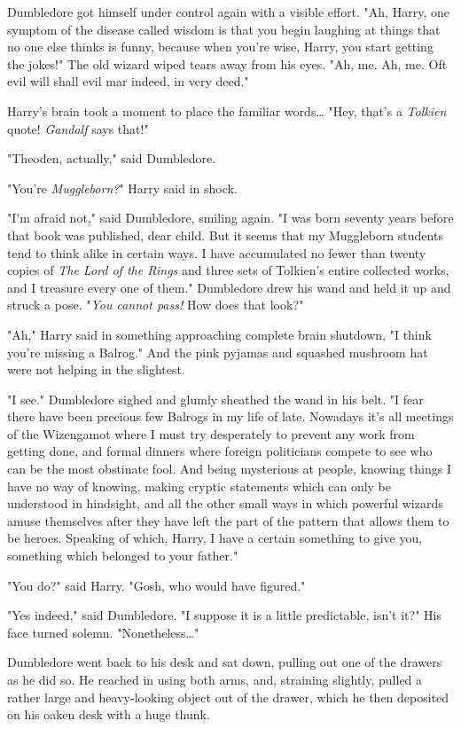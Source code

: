 Dumbledore got himself under control again with a visible effort. "Ah, Harry,
one symptom of the disease called wisdom is that you begin laughing at things
that no one else thinks is funny, because when you're wise, Harry, you start
getting the jokes!" The old wizard wiped tears away from his eyes. "Ah, me. Ah,
me. Oft evil will shall evil mar indeed, in very deed."

Harry's brain took a moment to place the familiar words{\ldots} "Hey, that's a
\emph{Tolkien} quote! \emph{Gandalf} says that!"

"Theoden, actually," said Dumbledore.

"You're \emph{Muggleborn?}" Harry said in shock.

"I'm afraid not," said Dumbledore, smiling again. "I was born seventy years
before that book was published, dear child. But it seems that my Muggleborn
students tend to think alike in certain ways. I have accumulated no fewer than
twenty copies of \emph{The Lord of the Rings} and three sets of Tolkien's
entire collected works, and I treasure every one of them." Dumbledore drew his
wand and held it up and struck a pose. "\emph{You cannot pass!} How does that
look?"

"Ah," Harry said in something approaching complete brain shutdown, "I think
you're missing a Balrog." And the pink pyjamas and squashed mushroom hat were
not helping in the slightest.

"I see." Dumbledore sighed and glumly sheathed the wand in his belt. "I fear
there have been precious few Balrogs in my life of late. Nowadays it's all
meetings of the Wizengamot where I must try desperately to prevent any work
from getting done, and formal dinners where foreign politicians compete to see
who can be the most obstinate fool. And being mysterious at people, knowing
things I have no way of knowing, making cryptic statements which can only be
understood in hindsight, and all the other small ways in which powerful wizards
amuse themselves after they have left the part of the pattern that allows them
to be heroes. Speaking of which, Harry, I have a certain something to give you,
something which belonged to your father."

"You do?" said Harry. "Gosh, who would have figured."

"Yes indeed," said Dumbledore. "I suppose it is a little predictable, isn't
it?" His face turned solemn. "Nonetheless{\ldots}"

Dumbledore went back to his desk and sat down, pulling out one of the drawers
as he did so. He reached in using both arms, and, straining slightly, pulled a
rather large and heavy-looking object out of the drawer, which he then
deposited on his oaken desk with a huge thunk.

